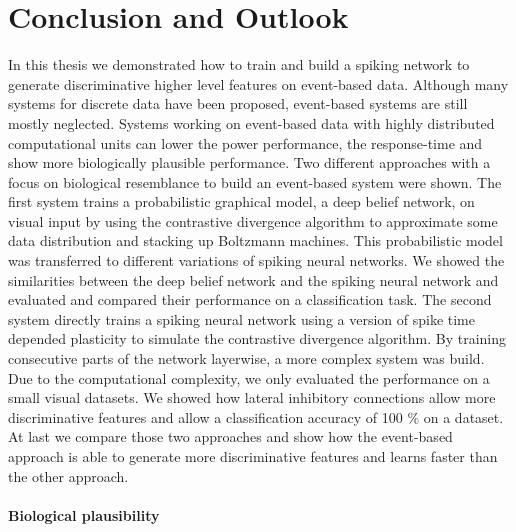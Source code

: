 \chapter{Conclusion and Outlook} \label{c:conclusion}

In this thesis we demonstrated how to train and build a spiking network to generate discriminative higher level features on event-based data.
Although many systems for discrete data have been proposed, event-based systems are still mostly neglected.
Systems working on event-based data with highly distributed computational units can lower the power performance, the response-time and show more biologically plausible performance.  
Two different approaches with a focus on biological resemblance to build an event-based system were shown.
The first system trains a probabilistic graphical model, a deep belief network, on visual input by using the contrastive divergence algorithm to approximate some data distribution and stacking up Boltzmann machines.
This probabilistic model was transferred to different variations of spiking neural networks.
We showed the similarities between the deep belief network and the spiking neural network and evaluated and compared their performance on a classification task.   
The second system directly trains a spiking neural network using a version of spike time depended plasticity to simulate the contrastive divergence algorithm. By training consecutive parts of the network layerwise, a more complex system was build. Due to the computational complexity, we only evaluated the performance on a small visual datasets. We showed how lateral inhibitory connections allow more discriminative features and allow a classification accuracy of 100 $\%$ on a dataset.
At last we compare those two approaches and show how the event-based approach is able to generate more discriminative features and learns faster than the other approach.  

\subsubsection{Biological plausibility} \label{c:bioplau}

